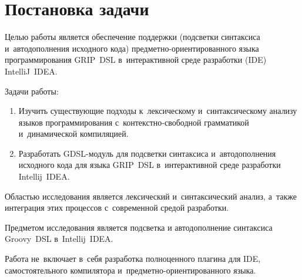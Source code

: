 \section{Постановка задачи} \label{sub21}

Целью работы является обеспечение поддержки (подсветки синтаксиса и~автодополнения исходного кода) предметно-ориентированного языка программирования GRIP~DSL в~интерактивной среде разработки (IDE) IntelliJ~IDEA.

Задачи работы: 

\begin{enumerate} 
\item{Изучить существующие подходы к~лексическому и~синтаксическому анализу языков программирования с~контекстно-свободной грамматикой и~динамической компиляцией.}	
\item{Разработать GDSL-модуль для подсветки синтаксиса и~автодополнения исходного кода для языка GRIP~DSL в~интерактивной среде разработки Intellij~IDEA.}
\end{enumerate} 

Областью исследования является лексический и~синтаксический анализ, а~также интеграция этих процессов с~современной средой разработки.

Предметом исследования является подсветка и автодополнение синтаксиса Groovy~DSL в~Intellij~IDEA. 

Работа не~включает в~себя разработка полноценного плагина для IDE, самостоятельного компилятора и~предметно-ориентированного языка.
